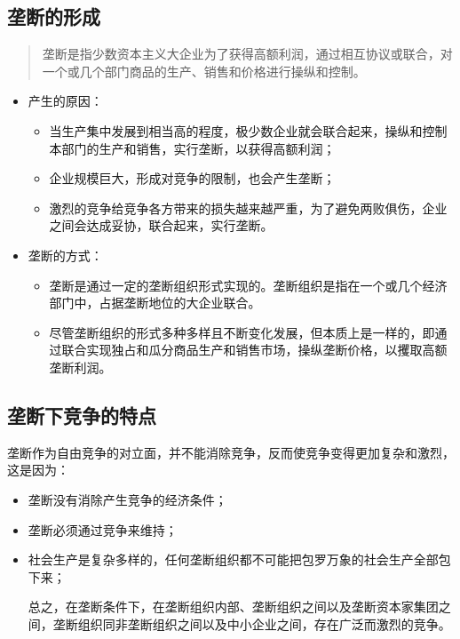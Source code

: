 \documentclass[
]{article}
\begin{document}
\hypertarget{ux5784ux65adux7684ux5f62ux6210}{%
\subsection{垄断的形成}\label{ux5784ux65adux7684ux5f62ux6210}}

\begin{quote}
垄断是指少数资本主义大企业为了获得高额利润，通过相互协议或联合，对一个或几个部门商品的生产、销售和价格进行操纵和控制。
\end{quote}

\begin{itemize}
\item
  产生的原因：

  \begin{itemize}
  \item
    当生产集中发展到相当高的程度，极少数企业就会联合起来，操纵和控制本部门的生产和销售，实行垄断，以获得高额利润；
  \item
    企业规模巨大，形成对竞争的限制，也会产生垄断；
  \item
    激烈的竞争给竞争各方带来的损失越来越严重，为了避免两败俱伤，企业之间会达成妥协，联合起来，实行垄断。
  \end{itemize}
\item
  垄断的方式：

  \begin{itemize}
  \item
    垄断是通过一定的垄断组织形式实现的。垄断组织是指在一个或几个经济部门中，占据垄断地位的大企业联合。
  \item
    尽管垄断组织的形式多种多样且不断变化发展，但本质上是一样的，即通过联合实现独占和瓜分商品生产和销售市场，操纵垄断价格，以攫取高额垄断利润。
  \end{itemize}
\end{itemize}

\hypertarget{ux5784ux65adux4e0bux7adeux4e89ux7684ux7279ux70b9}{%
\subsection{垄断下竞争的特点}\label{ux5784ux65adux4e0bux7adeux4e89ux7684ux7279ux70b9}}

垄断作为自由竞争的对立面，并不能消除竞争，反而使竞争变得更加复杂和激烈，这是因为：

\begin{itemize}
\item
  垄断没有消除产生竞争的经济条件；
\item
  垄断必须通过竞争来维持；
\item
  社会生产是复杂多样的，任何垄断组织都不可能把包罗万象的社会生产全部包下来；

  总之，在垄断条件下，在垄断组织内部、垄断组织之间以及垄断资本家集团之间，垄断组织同非垄断组织之间以及中小企业之间，存在广泛而激烈的竞争。
\end{itemize}
\end{document}
